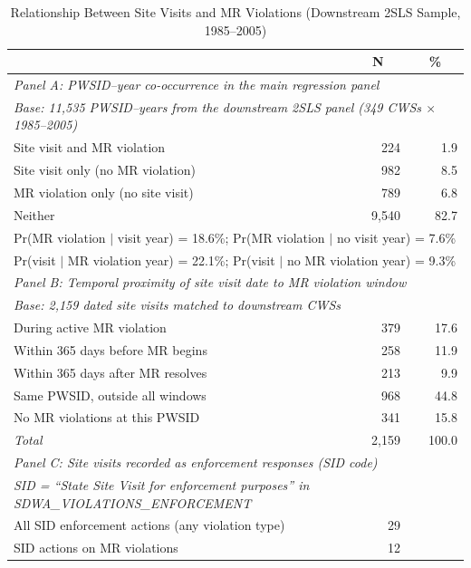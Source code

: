 \begin{table}[htbp]
\centering
\caption{Relationship Between Site Visits and MR Violations (Downstream 2SLS Sample, 1985--2005)}
\label{tab:site_visit_mr_link}
\small
\begin{tabular}{lrr}
\hline\hline
 & \multicolumn{1}{c}{N} & \multicolumn{1}{c}{\%} \\
\hline
\multicolumn{3}{l}{\textit{Panel A: PWSID--year co-occurrence in the main regression panel}} \\
\multicolumn{3}{l}{\footnotesize\textit{Base: 11,535 PWSID--years from the downstream 2SLS panel (349 CWSs $\times$ 1985--2005)}} \\[2pt]
Site visit and MR violation & 224 & 1.9 \\
Site visit only (no MR violation) & 982 & 8.5 \\
MR violation only (no site visit) & 789 & 6.8 \\
Neither & 9,540 & 82.7 \\
\hline
\multicolumn{3}{l}{\footnotesize Pr(MR violation $|$ visit year) = 18.6\%; Pr(MR violation $|$ no visit year) = 7.6\%} \\
\multicolumn{3}{l}{\footnotesize Pr(visit $|$ MR violation year) = 22.1\%; Pr(visit $|$ no MR violation year) = 9.3\%} \\[6pt]
\multicolumn{3}{l}{\textit{Panel B: Temporal proximity of site visit date to MR violation window}} \\
\multicolumn{3}{l}{\footnotesize\textit{Base: 2,159 dated site visits matched to downstream CWSs}} \\[2pt]
During active MR violation & 379 & 17.6 \\
Within 365 days before MR begins & 258 & 11.9 \\
Within 365 days after MR resolves & 213 & 9.9 \\
Same PWSID, outside all windows & 968 & 44.8 \\
No MR violations at this PWSID & 341 & 15.8 \\
\hline
\textit{Total} & 2,159 & 100.0 \\[6pt]
\multicolumn{3}{l}{\textit{Panel C: Site visits recorded as enforcement responses (SID code)}} \\
\multicolumn{3}{l}{\footnotesize\textit{SID = ``State Site Visit for enforcement purposes'' in SDWA\_VIOLATIONS\_ENFORCEMENT}} \\[2pt]
All SID enforcement actions (any violation type) & 29 & \\
SID actions on MR violations & 12 & \\

\end{tabular}
\end{table}
